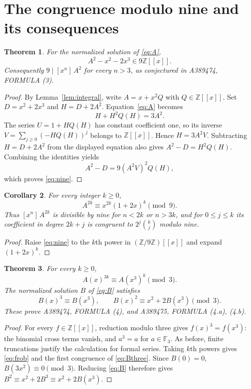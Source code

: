 \documentclass[11pt]{article}
\newtheorem{theorem}{Theorem}
\newtheorem{corollary}[theorem]{Corollary}
\newcommand{\Z}{\mathbb Z}
\newcommand{\F}{\mathbb F}
\newcommand{\coef}[2]{[x^{#1}]\,#2}
\begin{document}
\section{The congruence modulo nine and its consequences}

\begin{theorem}\label{thm:nine}
For the normalized solution of \eqref{eq:A},
\begin{equation}\label{eq:nine}
 A^2-x^2-2x^3\in9\Z[[x]].
\end{equation}
Consequently $9\mid\coef{n}{A^2}$ for every $n>3$,
as conjectured in A389474, FORMULA (3).
\end{theorem}
\begin{proof}
By Lemma~\ref{lem:integral}, write $A=x+x^2Q$ with
$Q\in\Z[[x]]$. Set $D=x^2+2x^3$ and $H=D+2A^2$.
Equation~\eqref{eq:A} becomes
\[
 H+H^2Q(H)=3A^2.
\]
The series $U=1+HQ(H)$ has constant coefficient one, so its inverse
$V=\sum_{j\ge0}(-HQ(H))^j$ belongs to $\Z[[x]]$.
Hence $H=3A^2V$. Subtracting $H=D+2A^2$ from the displayed
equation also gives $A^2-D=H^2Q(H)$. Combining the identities yields
\[
 A^2-D=9(A^2V)^2Q(H),
\]
which proves \eqref{eq:nine}.
\end{proof}

\begin{corollary}\label{cor:powers}
For every integer $k\ge0$,
\[
 A^{2k}\equiv x^{2k}(1+2x)^k\pmod9.
\]
Thus $\coef{n}{A^{2k}}$ is divisible by nine for
$n<2k$ or $n>3k$, and for $0\le j\le k$ its coefficient
in degree $2k+j$ is congruent to $2^j\binom{k}{j}$ modulo nine.
\end{corollary}
\begin{proof}
Raise \eqref{eq:nine} to the $k$th power in $(\Z/9\Z)[[x]]$
and expand $(1+2x)^k$.
\end{proof}

\begin{theorem}\label{thm:three}
For every $k\ge0$,
\begin{equation}\label{eq:frob}
 A(x)^{3k}\equiv A(x^3)^k\pmod3.
\end{equation}
The normalized solution $B$ of \eqref{eq:B} satisfies
\begin{equation}\label{eq:Bthree}
 B(x)^3\equiv B(x^3),\qquad
 B(x)^2\equiv x^2+2B(x^3)\pmod3.
\end{equation}
These prove A389474, FORMULA (4), and A389475,
FORMULA (4.a), (4.b).
\end{theorem}
\begin{proof}
For every $f\in\Z[[x]]$, reduction modulo three gives
$f(x)^3=f(x^3)$: the binomial cross terms vanish, and
$a^3=a$ for $a\in\F_3$. As before, finite truncations justify
the calculation for formal series. Taking $k$th powers gives
\eqref{eq:frob} and the first congruence of \eqref{eq:Bthree}.
Since $B(0)=0$, $B(3x^2)\equiv0\pmod3$.
Reducing \eqref{eq:B} therefore gives
$B^2\equiv x^2+2B^3\equiv x^2+2B(x^3)$.
\end{proof}
\end{document}
